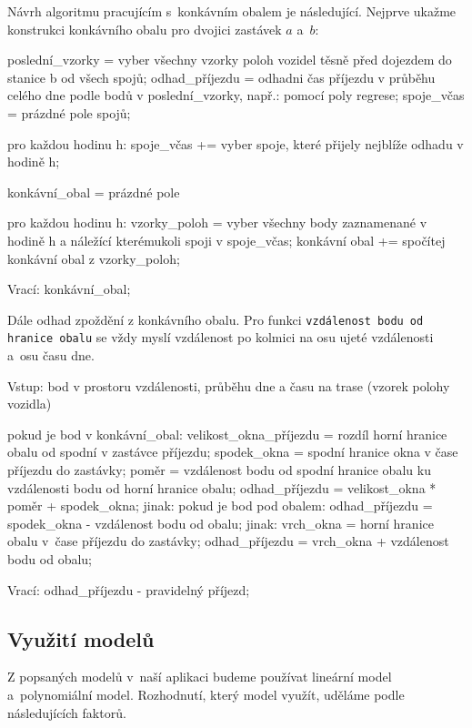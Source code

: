 \bigbreak

Návrh algoritmu pracujícím s~konkávním obalem je následující. Nejprve ukaž\-me konstrukci konkávního obalu pro dvojici zastávek $a$ a~$b$:


\begin{code}[frame=none]
poslední_vzorky = vyber všechny vzorky poloh vozidel
  těsně před dojezdem do stanice b od všech spojů;
odhad_příjezdu = odhadni čas příjezdu v průběhu celého
  dne podle bodů v poslední_vzorky, např.: pomocí poly regrese;
spoje_včas = prázdné pole spojů;


pro každou hodinu h:
  spoje_včas += vyber spoje, které přijely nejblíže
    odhadu v hodině h;


konkávní_obal = prázdné pole


pro každou hodinu h:
  vzorky_poloh = vyber všechny body zaznamenané
    v hodině h a náležící kterémukoli spoji v spoje_včas;
  konkávní obal += spočítej konkávní obal z vzorky_poloh;


Vrací: konkávní_obal;
\end{code}


Dále odhad zpoždění z konkávního obalu. Pro funkci \texttt{vzdálenost bodu od hranice obalu} se vždy myslí vzdálenost po kolmici na osu ujeté vzdálenosti a~osu času dne.


\begin{code}[frame=none]
Vstup: bod v prostoru vzdálenosti, průběhu dne
  a času na trase (vzorek polohy vozidla)


pokud je bod v konkávní_obal:
  velikost_okna_příjezdu = rozdíl horní hranice obalu od spodní
    v zastávce příjezdu;
  spodek_okna = spodní hranice okna v čase
    příjezdu do zastávky;
  poměr = vzdálenost bodu od spodní hranice obalu
    ku vzdálenosti bodu od horní hranice obalu;
  odhad_příjezdu = velikost_okna * poměr + spodek_okna;
jinak:
  pokud je bod pod obalem:
    odhad_příjezdu = spodek_okna - vzdálenost bodu od obalu;
  jinak:
    vrch_okna = horní hranice obalu
  v~čase příjezdu do zastávky;
    odhad_příjezdu = vrch_okna + vzdálenost bodu od obalu;


Vrací: odhad_příjezdu - pravidelný příjezd;
\end{code}


\subsection{Využití modelů}


Z popsaných modelů v~naší aplikaci budeme používat lineární model a~polynomiální model. Rozhodnutí, který model využít, uděláme podle následujících faktorů.


